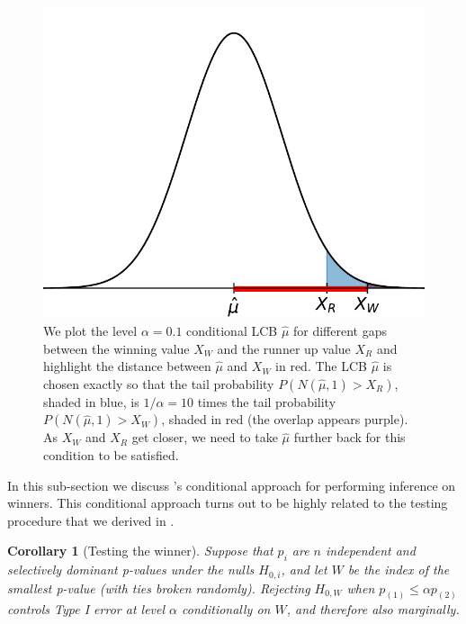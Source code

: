 \documentclass{article}
\newtheorem{corollary}{Corollary}
\begin{document}
\begin{figure}[]
{\begin{minipage}{0.33\textwidth}
    \end{minipage}\hfill
    \hspace{0.02\textwidth}
    \begin{minipage}{0.33\textwidth}
        \centering
        \includegraphics[width=\textwidth]{tail_prob_3.pdf}
    \end{minipage}
    }
    \caption{We plot the level $\alpha=0.1$ conditional LCB $\hat{\mu}$ for different gaps between the winning value $X_W$ and the runner up value $X_R$ and highlight the distance between $\hat{\mu}$ and $X_W$ in red. The LCB $\hat{\mu}$ is chosen exactly so that the tail probability $P(N(\hat{\mu}, 1) > X_R)$, shaded in blue, is $1/\alpha=10$ times the tail probability $P(N(\hat{\mu}, 1) > X_W)$, shaded in red (the overlap appears purple). As $X_W$ and $X_R$ get closer, we need to take $\hat{\mu}$ further back for this condition to be satisfied.}
    \label{fig:tail_prob}
\end{figure}

In this sub-section we discuss \cite{Fithian2017}'s conditional approach for performing inference on winners. This conditional approach turns out to be highly related to the testing procedure that we derived in . 

\begin{corollary}[Testing the winner]
    \label{cor:cond}
    Suppose that $p_i$ are $n$ independent and selectively dominant p-values under the nulls $H_{0, i}$, and let $W$ be the index of the smallest p-value (with ties broken randomly). Rejecting $H_{0, W}$ when $p_{(1)} \leq \alpha p_{(2)}$ controls Type I error at level $\alpha$ conditionally on $W$, and therefore also marginally. 
\end{corollary}
\end{document}

